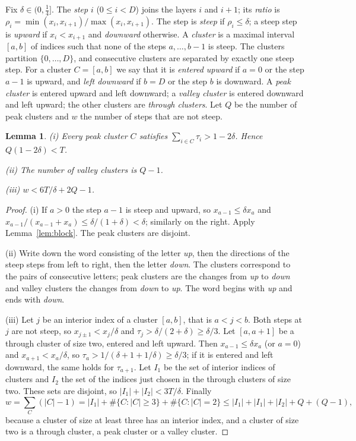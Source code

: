 \documentclass[11pt]{amsart}
\newtheorem{lemma}[theorem]{Lemma}
\theoremstyle{definition}
\theoremstyle{remark}
\begin{document}
Fix $\delta\in(0,\tfrac14]$.
The \emph{step} $i$ ($0\le i<D$) joins the layers $i$ and $i+1$; its \emph{ratio} is $\rho_i=\min(x_i,x_{i+1})/\max(x_i,x_{i+1})$.
The step is \emph{steep} if $\rho_i\le\delta$; a steep step is \emph{upward} if $x_i<x_{i+1}$ and \emph{downward} otherwise.
A \emph{cluster} is a maximal interval $[a,b]$ of indices such that none of the steps $a,\dots,b-1$ is steep.
The clusters partition $\{0,\dots,D\}$, and consecutive clusters are separated by exactly one steep step.
For a cluster $C=[a,b]$ we say that it is \emph{entered upward} if $a=0$ or the step $a-1$ is upward, and \emph{left downward} if $b=D$ or the step $b$ is downward.
A \emph{peak cluster} is entered upward and left downward; a \emph{valley cluster} is entered downward and left upward; the other clusters are \emph{through clusters}.
Let $Q$ be the number of peak clusters and $w$ the number of steps that are not steep.

\begin{lemma}\label{lem:peaks}
{\rm(i)} Every peak cluster $C$ satisfies $\sum_{i\in C}\tau_i>1-2\delta$. Hence $Q(1-2\delta)<T$.

{\rm(ii)} The number of valley clusters is $Q-1$.

{\rm(iii)} $w<6T/\delta+2Q-1$.
\end{lemma}

\begin{proof}
(i) If $a>0$ the step $a-1$ is steep and upward, so $x_{a-1}\le\delta x_a$ and $x_{a-1}/(x_{a-1}+x_a)\le\delta/(1+\delta)<\delta$; similarly on the right. Apply Lemma~\ref{lem:block}. The peak clusters are disjoint.

(ii) Write down the word consisting of the letter \emph{up}, then the directions of the steep steps from left to right, then the letter \emph{down}. The clusters correspond to the pairs of consecutive letters; peak clusters are the changes from \emph{up} to \emph{down} and valley clusters the changes from \emph{down} to \emph{up}. The word begins with \emph{up} and ends with \emph{down}.

(iii) Let $j$ be an interior index of a cluster $[a,b]$, that is $a<j<b$. Both steps at $j$ are not steep, so $x_{j\pm1}<x_j/\delta$ and $\tau_j>\delta/(2+\delta)\ge\delta/3$.
Let $[a,a+1]$ be a through cluster of size two, entered and left upward. Then $x_{a-1}\le\delta x_a$ (or $a=0$) and $x_{a+1}<x_a/\delta$, so $\tau_a>1/(\delta+1+1/\delta)\ge\delta/3$; if it is entered and left downward, the same holds for $\tau_{a+1}$.
Let $I_1$ be the set of interior indices of clusters and $I_2$ the set of the indices just chosen in the through clusters of size two. These sets are disjoint, so $|I_1|+|I_2|<3T/\delta$.
Finally
\[
w=\sum_C(|C|-1)=|I_1|+\#\{C:|C|\ge3\}+\#\{C:|C|=2\}\le|I_1|+|I_1|+|I_2|+Q+(Q-1),
\]
because a cluster of size at least three has an interior index, and a cluster of size two is a through cluster, a peak cluster or a valley cluster.
\end{proof}
\end{document}
